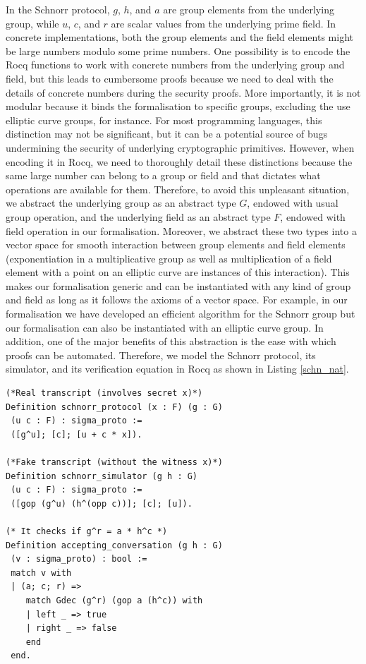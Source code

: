 \documentclass[sigconf,anonymous,review]{acmart}
\begin{document}
In the Schnorr protocol, $g$, $h$, and $a$ are group elements from the underlying group, while $u$, $c$, and $r$ are scalar values from the underlying prime field. In concrete implementations, both the group elements and the field elements might be large 
numbers modulo some prime numbers. 
One possibility is to encode the Rocq functions to work with concrete numbers from the underlying group and field, but this leads to cumbersome proofs because we need to deal with the details of concrete numbers during the security proofs. More importantly, it is not modular because it binds the formalisation to specific groups, excluding the use elliptic curve groups, for instance. For most programming languages, this distinction 
may not be significant, but it can be a potential source of bugs \cite{10.1007/978-3-662-63958-0_24} undermining the security of underlying cryptographic primitives. 
However, when encoding it in Rocq, we need to thoroughly detail these distinctions because 
the same large number can belong to a group or field and that dictates what operations are available for them. 
Therefore, to avoid this unpleasant situation,  
we abstract the underlying group as an abstract type $G$, endowed with 
usual group operation, and the underlying field as an abstract type $F$, endowed with 
field operation in our formalisation. 
Moreover, we abstract these two types into a vector space for smooth interaction between 
group elements and field elements (exponentiation in a multiplicative group as well as multiplication of a field element 
with a point on an elliptic curve are instances of this interaction). This 
makes our formalisation generic and can be instantiated with 
any kind of group and field as long as it follows the axioms of 
a vector space. For example, in our formalisation we have developed 
an efficient algorithm for the Schnorr group but our formalisation can 
also be instantiated with an elliptic curve group. In addition, 
one of the major benefits of this abstraction is the ease with which proofs 
can be automated. Therefore, we model the Schnorr 
protocol, its simulator, and its verification equation in Rocq as shown in 
Listing \ref{schn_nat}. 
\begin{lstlisting}[frame=single, language=Coq, caption={Schnorr protocol},
  label={schn_nat},captionpos=t, basicstyle=\ttfamily\footnotesize,
  abovecaptionskip=-\medskipamount]
(*Real transcript (involves secret x)*)
Definition schnorr_protocol (x : F) (g : G) 
 (u c : F) : sigma_proto :=  
 ([g^u]; [c]; [u + c * x]).

(*Fake transcript (without the witness x)*)
Definition schnorr_simulator (g h : G) 
 (u c : F) : sigma_proto := 
 ([gop (g^u) (h^(opp c))]; [c]; [u]).

(* It checks if g^r = a * h^c *)
Definition accepting_conversation (g h : G) 
 (v : sigma_proto) : bool :=
 match v with
 | (a; c; r) =>  
    match Gdec (g^r) (gop a (h^c)) with 
    | left _ => true
    | right _ => false 
    end
 end.
\end{lstlisting}
  
\end{document}
